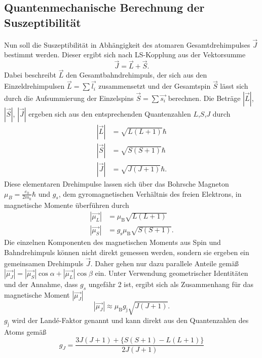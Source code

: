 \subsection{Quantenmechanische Berechnung der Suszeptibilität}
Nun soll die Suszeptibilität in Abhängigkeit des atomaren Gesamtdrehimpulses $\vec{J}$ bestimmt werden.
Dieser ergibt sich nach LS-Kopplung aus der Vektorsumme 
\begin{equation*}
    \vec{J}= \vec{L}+\vec{S}.
    \label{eq:LS}
\end{equation*}
Dabei beschreibt $\vec{L}$ den Gesamtbahndrehimpuls, der sich aus den Einzeldrehimpulsen $\vec{L}=\sum\vec{l_i}$ zusammensetzt
und der Gesamtspin $\vec{S}$ lässt sich durch die Aufsummierung der Einzelspins $\vec{S}=\sum \vec{s_i}$ berechnen.
Die Beträge $\left|\vec{L}\right|$, $\left|\vec{S}\right|$, $\left|\vec{J}\right|$ ergeben sich aus den
entsprechenden Quantenzahlen $L$,$S$,$J$ durch 
\begin{align*}
    \left|\vec{L}\right|&=\sqrt{L(L+1)}\hbar\\
    \left|\vec{S}\right|&=\sqrt{S(S+1)}\hbar\\
    \left|\vec{J}\right|&=\sqrt{J(J+1)}\hbar.
\end{align*}
Diese elementaren Drehimpulse lassen sich über das Bohrsche Magneton $\mu_B=\frac{e_0}{2m_0}\hbar$ und
$g_s$, dem gyromagnetischen Verhältnis des freien Elektrons, in magnetische Momente überführen durch
\begin{align*}
    \left|\vec{\mu_L}\right|&=\mu_\text{B}\sqrt{L(L+1)}\\
    \left|\vec{\mu_S}\right|&=g_\text{s} \mu_\text{B}\sqrt{S(S+1)}.
\end{align*}
Die einzelnen Komponenten des magnetischen Moments aus Spin und Bahndrehimpuls können nicht direkt gemessen werden, sondern
sie ergeben ein gemeinsamen Drehimpuls $\vec{J}$. Daher gehen nur dazu parallele Anteile gemäß
$\left|\vec{\mu_J}\right|=\left|\vec{\mu_S}\right|\cos{\alpha}+\left|\vec{\mu_L}\right|\cos{\beta}$ ein.
Unter Verwendung geometrischer Identitäten und der Annahme, dass $g_s$ ungefähr 2 ist, ergibt sich als Zusammenhang für
das magnetische Moment $\left|\vec{\mu_J}\right|$
\begin{equation*}
    \left|\vec{\mu_J}\right| \approx \mu_\text{B} g_\text{j} \sqrt{J(J+1)}.
    \label{eq:muj}
\end{equation*}
$g_\text{j}$ wird der Landé-Faktor genannt und kann direkt aus den Quantenzahlen des Atoms gemäß
\begin{equation}
    g_J=\frac{3J(J+1)+\{S(S+1)-L(L+1)\}}{2J(J+1)}
    \label{eq:lande}
\end{equation}
